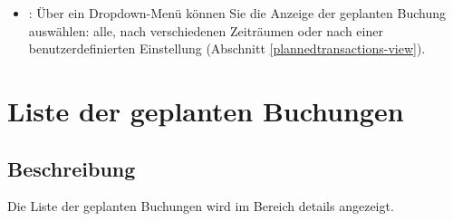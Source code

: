 \begin{itemize}
	\item {}: Über ein Dropdown-Menü können Sie die Anzeige der geplanten Buchung auswählen: alle, nach verschiedenen Zeiträumen oder nach einer benutzerdefinierten Einstellung (Abschnitt \vref{plannedtransactions-view}).
\end{itemize}


\section{Liste der geplanten Buchungen\label{plannedtransactions-list}}


\subsection{Beschreibung\label{plannedtransactions-list-description}}

Die Liste der geplanten Buchungen wird im Bereich details angezeigt.

